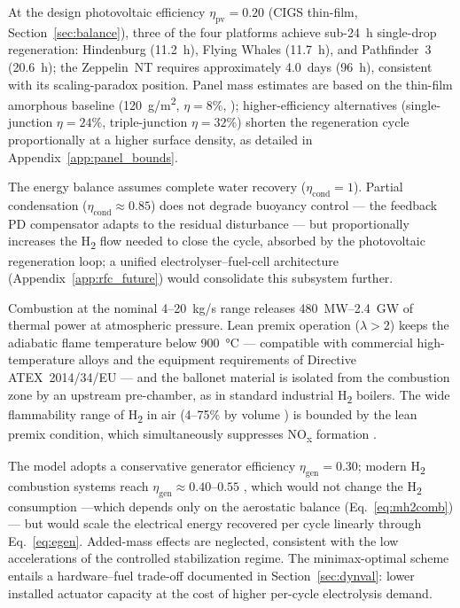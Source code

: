 \documentclass[applsci,article,submit,pdftex,moreauthors]{Definitions/mdpi}
\newcommand{\added}[1]{#1}
\newcommand{\addedR}[1]{\textcolor{green!60!black}{#1}}
\begin{document}
\addedR{At the design photovoltaic efficiency $\eta_\text{pv} = 0.20$ (CIGS thin-film, Section~\ref{sec:balance}), three of the four platforms achieve sub-24~h single-drop regeneration: Hindenburg (11.2~h), Flying Whales (11.7~h), and Pathfinder~3 (20.6~h); the Zeppelin~NT requires approximately 4.0~days (96~h), consistent with its scaling-paradox position. Panel mass estimates are based on the thin-film amorphous baseline (120~g/m\textsuperscript{2}, $\eta = 8\%$, \cite{Pande2018}); higher-efficiency alternatives (single-junction $\eta=24\%$, triple-junction $\eta=32\%$) shorten the regeneration cycle proportionally at a higher surface density, as detailed in Appendix~\ref{app:panel_bounds}.}

\addedR{The energy balance assumes complete water recovery ($\eta_\text{cond} = 1$). Partial condensation ($\eta_\text{cond} \approx 0.85$) does not degrade buoyancy control --- the feedback PD compensator adapts to the residual disturbance --- but proportionally increases the H\textsubscript{2} flow needed to close the cycle, absorbed by the photovoltaic regeneration loop; a unified electrolyser--fuel-cell architecture (Appendix~\ref{app:rfc_future}) would consolidate this subsystem further.}

\added{Combustion at the nominal 4--20~kg/s range releases 480~MW--2.4~GW of thermal power at atmospheric pressure. Lean premix operation ($\lambda > 2$) keeps the adiabatic flame temperature below 900~°C \cite{Turns2011,Giacomazzi2023} --- compatible with commercial high-temperature alloys and the equipment requirements of Directive ATEX~2014/34/EU --- and the ballonet material is isolated from the combustion zone by an upstream pre-chamber, as in standard industrial H\textsubscript{2} boilers. The wide flammability range of H\textsubscript{2} in air (4--75\% by volume \cite{Najjar2013}) is bounded by the lean premix condition, which simultaneously suppresses NO\textsubscript{x} formation \cite{Giacomazzi2023}.}

\added{The model adopts a conservative generator efficiency $\eta_\text{gen} = 0.30$; modern H\textsubscript{2} combustion systems reach $\eta_\text{gen} \approx 0.40$--$0.55$ \cite{ref9,Boretti2020H2ICE,Stepien2021,Wrobel2022}, which would not change the H\textsubscript{2} consumption ---which depends only on the aerostatic balance (Eq.~\eqref{eq:mh2comb})--- but would scale the electrical energy recovered per cycle linearly through Eq.~\eqref{eq:egen}. Added-mass effects \cite{Li2007} are neglected, consistent with the low accelerations of the controlled stabilization regime. The minimax-optimal scheme entails a hardware--fuel trade-off documented in Section~\ref{sec:dynval}: lower installed actuator capacity at the cost of higher per-cycle electrolysis demand.}
\end{document}
